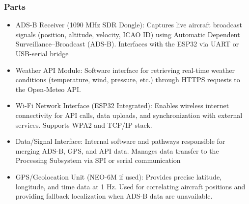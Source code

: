 \subsubsection{Parts}
\begin{itemize}
    \item ADS-B Receiver (1090 MHz SDR Dongle): Captures live aircraft broadcast signals (position, altitude, velocity, ICAO ID) using Automatic Dependent Surveillance–Broadcast (ADS-B). Interfaces with the ESP32 via UART or USB-serial bridge
    \item Weather API Module: Software interface for retrieving real-time weather conditions (temperature, wind, pressure, etc.) through HTTPS requests to the Open-Meteo API.
    \item Wi-Fi Network Interface (ESP32 Integrated): Enables wireless internet connectivity for API calls, data uploads, and synchronization with external services. Supports WPA2 and TCP/IP stack.
    \item Data/Signal Interface: Internal software and pathways responsible for merging ADS-B, GPS, and API data. Manages data transfer to the Processing Subsystem via SPI or serial communication
    \item GPS/Geolocation Unit (NEO-6M if used): Provides precise latitude, longitude, and time data at 1 Hz. Used for correlating aircraft positions and providing fallback localization when ADS-B data are unavailable.
\end{itemize}

